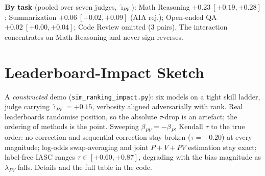 \documentclass{article}
\begin{document}
\smallskip
\noindent\textbf{By task} (pooled over seven judges,
$\hat\imath_{PV}$): Math Reasoning $+0.23\ [+0.19,+0.28]$;
Summarization $+0.06\ [+0.02,+0.09]$ (AIA rej.); Open-ended QA
$+0.02\ [+0.00,+0.04]$; Code Review omitted (3 pairs). The
interaction concentrates on Math Reasoning and never sign-reverses.

\section{Leaderboard-Impact Sketch}
\label{app:ranksweep}
A \emph{constructed} demo (\texttt{sim\_ranking\_impact.py}): six
models on a tight skill ladder, judge carrying
$\hat\imath_{PV}={+}0.15$, verbosity aligned adversarially with
rank. Real leaderboards randomise position, so the absolute
$\tau$-drop is an artefact; the ordering of methods is the point.
Sweeping $\beta_{PV}{=}{-}\beta_P$, Kendall $\tau$ to the true
order: no correction and sequential correction stay broken
($\tau{=}{+}0.20$) at every magnitude; log-odds swap-averaging and
joint $P{+}V{+}PV$ estimation stay exact; label-free IASC ranges
$\tau\in[{+}0.60,{+}0.87]$, degrading with the bias magnitude as
$\lambda_{PV}$ falls. Details and the full table in the code.
\end{document}
